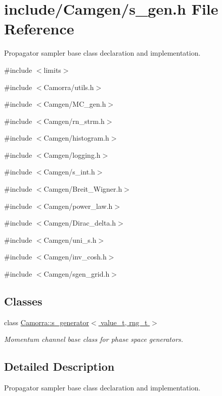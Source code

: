\hypertarget{a00595}{
\section{include/Camgen/s\_\-gen.h File Reference}
\label{a00595}
}


Propagator sampler base class declaration and implementation.  


{\ttfamily \#include $<$limits$>$}\par
{\ttfamily \#include $<$Camorra/utils.h$>$}\par
{\ttfamily \#include $<$Camgen/MC\_\-gen.h$>$}\par
{\ttfamily \#include $<$Camgen/rn\_\-strm.h$>$}\par
{\ttfamily \#include $<$Camgen/histogram.h$>$}\par
{\ttfamily \#include $<$Camgen/logging.h$>$}\par
{\ttfamily \#include $<$Camgen/s\_\-int.h$>$}\par
{\ttfamily \#include $<$Camgen/Breit\_\-Wigner.h$>$}\par
{\ttfamily \#include $<$Camgen/power\_\-law.h$>$}\par
{\ttfamily \#include $<$Camgen/Dirac\_\-delta.h$>$}\par
{\ttfamily \#include $<$Camgen/uni\_\-s.h$>$}\par
{\ttfamily \#include $<$Camgen/inv\_\-cosh.h$>$}\par
{\ttfamily \#include $<$Camgen/sgen\_\-grid.h$>$}\par
\subsection*{Classes}
\begin{DoxyCompactItemize}
\item 
class \hyperlink{a00441}{Camorra::s\_\-generator$<$ value\_\-t, rng\_\-t $>$}
\begin{DoxyCompactList}\small\item\em Momentum channel base class for phase space generators. \end{DoxyCompactList}\end{DoxyCompactItemize}


\subsection{Detailed Description}
Propagator sampler base class declaration and implementation. 